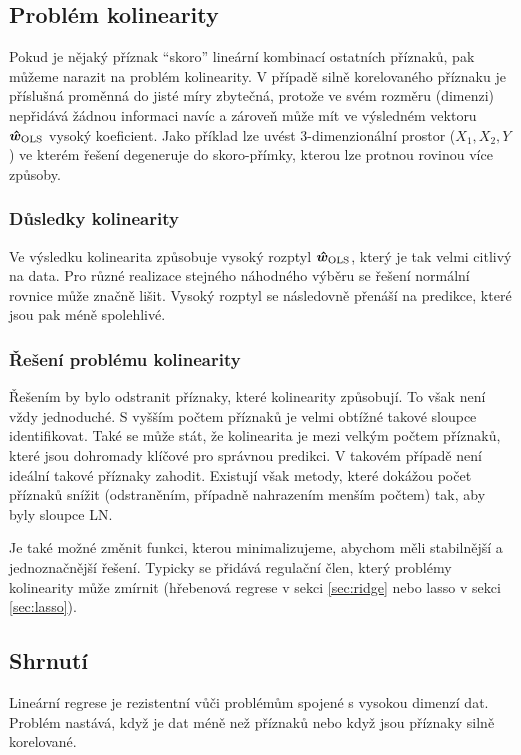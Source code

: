 \subsection{Problém kolinearity}

Pokud je nějaký příznak ``skoro'' lineární kombinací ostatních příznaků, pak můžeme narazit na problém kolinearity. V případě silně korelovaného příznaku je příslušná proměnná do jisté míry zbytečná, protože ve svém rozměru (dimenzi) nepřidává žádnou informaci navíc a zároveň může mít ve výsledném vektoru $\bm{\hat{w}}_{\text{OLS}}$ vysoký koeficient. Jako příklad lze uvést 3-dimenzionální prostor ($X_1, X_2, Y$) ve kterém řešení degeneruje do skoro-přímky, kterou lze protnou rovinou více způsoby.

\subsubsection{Důsledky kolinearity}

Ve výsledku kolinearita způsobuje vysoký rozptyl $\bm{\hat{w}}_{\text{OLS}}$, který je tak velmi citlivý na data. Pro různé realizace stejného náhodného výběru se řešení normální rovnice může značně lišit. Vysoký rozptyl se následovně přenáší na predikce, které jsou pak méně spolehlivé.

\subsubsection{Řešení problému kolinearity}

Řešením by bylo odstranit příznaky, které kolinearity způsobují. To však není vždy jednoduché. S vyšším počtem příznaků je velmi obtížné takové sloupce identifikovat. Také se může stát, že kolinearita je mezi velkým počtem příznaků, které jsou dohromady klíčové pro správnou predikci. V takovém případě není ideální takové příznaky zahodit. Existují však metody, které dokážou počet příznaků snížit (odstraněním, případně nahrazením menším počtem) tak, aby byly sloupce LN.

Je také možné změnit funkci, kterou minimalizujeme, abychom měli stabilnější a jednoznačnější řešení. Typicky se přidává regulační člen, který problémy kolinearity může zmírnit (hřebenová regrese v sekci \ref{sec:ridge} nebo lasso v sekci \ref{sec:lasso}).

\subsection{Shrnutí}

Lineární regrese je rezistentní vůči problémům spojené s vysokou dimenzí dat. Problém nastává, když je dat méně než příznaků nebo když jsou příznaky silně korelované.
